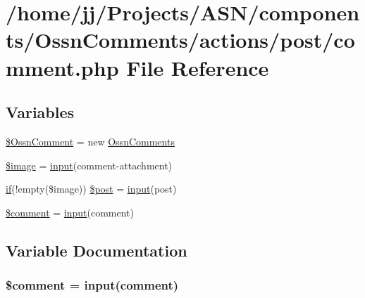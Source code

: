 \hypertarget{actions_2post_2comment_8php}{}\section{/home/jj/\+Projects/\+A\+S\+N/components/\+Ossn\+Comments/actions/post/comment.php File Reference}
\label{actions_2post_2comment_8php}
\subsection*{Variables}
\begin{DoxyCompactItemize}
\item 
\hyperlink{actions_2post_2comment_8php_a72b9fc252071bb4b4ec3ba0e1dc24760}{\$\+Ossn\+Comment} = new \hyperlink{class_ossn_comments}{Ossn\+Comments}
\item 
\hyperlink{actions_2post_2comment_8php_aac6146b4cdec66c94263ddb55afd5946}{\$image} = \hyperlink{ossn_8lib_8input_8php_a64ebee98b041c4f75f71ed3cd73cc8ed}{input}(\textquotesingle{}comment-\/attachment\textquotesingle{})
\item 
\hyperlink{jquery_8tokeninput_8js_ad8dd46a3cbc004569e34401e9e71771a}{if}(!empty(\$image)) \hyperlink{actions_2post_2comment_8php_a4fb32f285a9d3229aeaca99a18372945}{\$post} = \hyperlink{ossn_8lib_8input_8php_a64ebee98b041c4f75f71ed3cd73cc8ed}{input}(\textquotesingle{}post\textquotesingle{})
\item 
\hyperlink{actions_2post_2comment_8php_a536677acc0163c53c067316a97456e6c}{\$comment} = \hyperlink{ossn_8lib_8input_8php_a64ebee98b041c4f75f71ed3cd73cc8ed}{input}(\textquotesingle{}comment\textquotesingle{})
\end{DoxyCompactItemize}


\subsection{Variable Documentation}
\subsubsection[{\texorpdfstring{\$comment}{$comment}}]{\setlength{\rightskip}{0pt plus 5cm}\$comment = {\bf input}(\textquotesingle{}comment\textquotesingle{})}\hypertarget{actions_2post_2comment_8php_a536677acc0163c53c067316a97456e6c}{}\label{actions_2post_2comment_8php_a536677acc0163c53c067316a97456e6c}


